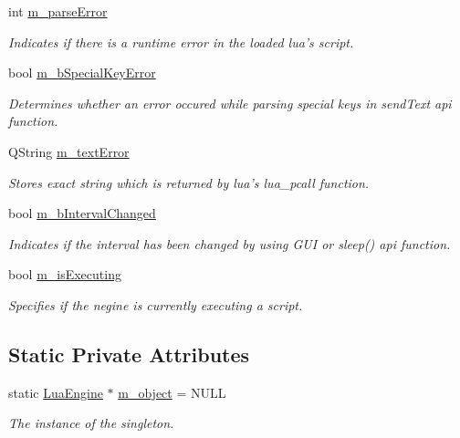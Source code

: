 \begin{DoxyCompactItemize}
int \hyperlink{class_lua_engine_ac7c65e343f73a0dadcbe2d5f1a5842f3}{m\-\_\-parse\-Error}
\begin{DoxyCompactList}\small\item\em Indicates if there is a runtime error in the loaded lua's script. \end{DoxyCompactList}\item 
bool \hyperlink{class_lua_engine_a5cac380e1359eb5a6cf95239e4ad2b19}{m\-\_\-b\-Special\-Key\-Error}
\begin{DoxyCompactList}\small\item\em Determines whether an error occured while parsing special keys in send\-Text api function. \end{DoxyCompactList}\item 
Q\-String \hyperlink{class_lua_engine_a0cb5dc043a3f9b162ad97245cd7e6956}{m\-\_\-text\-Error}
\begin{DoxyCompactList}\small\item\em Stores exact string which is returned by lua's lua\-\_\-pcall function. \end{DoxyCompactList}\item 
bool \hyperlink{class_lua_engine_add74083d158ee3543d0644c0b6349c5d}{m\-\_\-b\-Interval\-Changed}
\begin{DoxyCompactList}\small\item\em Indicates if the interval has been changed by using G\-U\-I or sleep() api function. \end{DoxyCompactList}\item 
bool \hyperlink{class_lua_engine_ad2bf267f4030d958e5a6f88a3a19e039}{m\-\_\-is\-Executing}
\begin{DoxyCompactList}\small\item\em Specifies if the negine is currently executing a script. \end{DoxyCompactList}\end{DoxyCompactItemize}
\subsection*{Static Private Attributes}
\begin{DoxyCompactItemize}
\item 
static \hyperlink{class_lua_engine}{Lua\-Engine} $\ast$ \hyperlink{class_lua_engine_a27899d8e22a8da3067519562500b9c7f}{m\-\_\-object} = N\-U\-L\-L
\begin{DoxyCompactList}\small\item\em The instance of the singleton. \end{DoxyCompactList}\end{DoxyCompactItemize}


